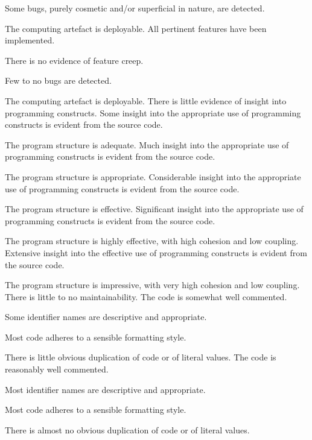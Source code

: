 \begin{markingrubric}
            \par Some bugs, purely cosmetic and/or superficial in nature, are detected.
            \par The computing artefact is deployable.
        \grade All pertinent features have been implemented.
            \par There is no evidence of feature creep.
            \par Few to no bugs are detected.
            \par The computing artefact is deployable.
%
        \grade \fail There is little evidence of insight into programming constructs.
        \grade Some insight into the appropriate use of programming constructs is evident from the source code.
            \par The program structure is adequate.
        \grade Much insight into the appropriate use of programming constructs is evident from the source code.
            \par The program structure is appropriate.
        \grade Considerable insight into the appropriate use of programming constructs is evident from the source code.
            \par The program structure is effective.
        \grade Significant insight into the appropriate use of programming constructs is evident from the source code.
            \par The program structure is highly effective, with high cohesion and low coupling.
        \grade Extensive insight into the effective use of programming constructs is evident from the source code.
            \par The program structure is impressive, with very high cohesion and low coupling.
%
        \grade \fail There is little to no maintainability. 
        \grade The code is somewhat well commented.
            \par Some identifier names are descriptive and appropriate.
            \par Most code adheres to a sensible formatting style.
             \par There is little obvious duplication of code or of literal values.           
        \grade The code is reasonably well commented.
            \par Most identifier names are descriptive and appropriate.
            \par Most code adheres to a sensible formatting style.
             \par There is almost no obvious duplication of code or of literal values.   

\end{markingrubric}
